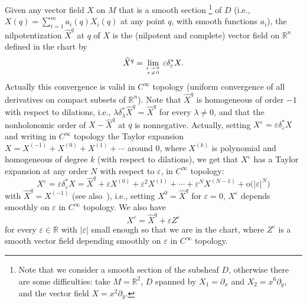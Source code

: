 \documentclass[10pt]{amsart}
\theoremstyle{definition}\newtheorem{defi}[theo]{Definition}\newtheorem{rema}[theo]{Remark}\newtheorem{exam}[theo]{Example}\newtheorem{exem}[theo]{Example}\newtheorem{nota}[theo]{Notation}
\newcommand*\R{\mathbb{R}}
\newcommand{\rmo}{\mathrm{o}}
\begin{document}
Given any vector field $X$ on $M$ that is a smooth section
\footnote{Note that we consider a smooth section of the subsheaf $D$, otherwise there are some difficulties: take $M=\R^2$, $D$ spanned by $X_1=\partial_x$ and $X_2=x^6\partial_y$, and the vector field $X=x^2\partial_y$.} of $D$ (i.e., $X(q) = \sum_{i=1}^m a_i(q) X_i(q)$ at any point $q$, with smooth functions $a_i$), the nilpotentization $\widehat{X}^{q}$ at $q$ of $X$ is the (nilpotent and complete) vector field on $\R^n$ defined in the chart by
\[
\widehat{X}^{q} = \lim_{\varepsilon\,\rightarrow\,0\,\atop \varepsilon\,\neq\,0}\varepsilon \delta_\varepsilon^* X.
\]
Actually this convergence is valid in $C^\infty$ topology (uniform convergence of all derivatives on compact subsets of $\R^n$). Note that $\widehat{X}^{q}$ is homogeneous of order $-1$ with respect to dilations, i.e., $\lambda\delta_\lambda^*\widehat{X}^{q}=\widehat{X}^{q}$ for every $\lambda\neq 0$, and that the nonholonomic order of $X-\widehat{X}^{q}$ at $q$ is nonnegative. Actually, setting $X^\varepsilon=\varepsilon\delta_\varepsilon^*X$ and writing in $C^\infty$ topology the Taylor expansion $X=X^{(-1)}+X^{(0)}+X^{(1)}+\cdots$ around $0$, where $X^{(k)}$ is polynomial and homogeneous of degree $k$ (with respect to dilations), we get that $X^\varepsilon$ has a Taylor expansion at any order $N$ with respect to $\varepsilon$, in $C^\infty$ topology:
\begin{equation}\label{expansion_Xeps}
X^\varepsilon = \varepsilon \delta_\varepsilon^* X = \widehat{X}^{q} + \varepsilon X^{(0)} + \varepsilon^2 X^{(1)} + \cdots + \varepsilon^N X^{(N-1)} + \rmo\big(\vert\varepsilon\vert^N\big)
\end{equation}
with $\widehat{X}^{q} = X^{(-1)}$ (see also~\cite[Lemma~1]{Ba-13}), i.e., setting $X^0=\widehat{X}^{q}$ for $\varepsilon=0$, $X^\varepsilon$ depends smoothly on $\varepsilon$ in $C^\infty$ topology. We also have
\begin{equation}\label{expansion_XZeps}
X^\varepsilon = \widehat{X}^{q} + \varepsilon Z^\varepsilon
\end{equation}
for every $\varepsilon\in\R$ with $\vert\varepsilon\vert$ small enough so that we are in the chart, where $Z^\varepsilon$ is a smooth vector field depending smoothly on $\varepsilon$ in $C^\infty$ topology.
\end{document}
